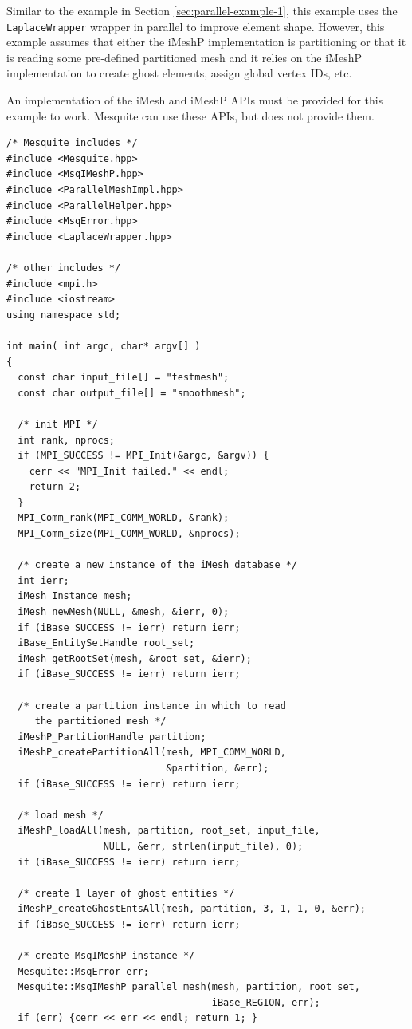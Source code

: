 Similar to the example in Section \ref{sec:parallel-example-1}, this example uses the \texttt{LaplaceWrapper} wrapper in parallel to improve element shape.  However, this example assumes that either the iMeshP implementation is partitioning or that it is reading some pre-defined partitioned mesh and it relies on the iMeshP implementation to create ghost elements, assign global vertex IDs, etc.  

An implementation of the iMesh and iMeshP APIs must be provided for this example to work.  Mesquite can use these APIs, but does not provide them.

\begin{verbatim}
/* Mesquite includes */
#include <Mesquite.hpp>
#include <MsqIMeshP.hpp>
#include <ParallelMeshImpl.hpp>
#include <ParallelHelper.hpp>
#include <MsqError.hpp>
#include <LaplaceWrapper.hpp>

/* other includes */
#include <mpi.h>
#include <iostream>
using namespace std;
  
int main( int argc, char* argv[] )
{
  const char input_file[] = "testmesh";
  const char output_file[] = "smoothmesh";

  /* init MPI */
  int rank, nprocs;
  if (MPI_SUCCESS != MPI_Init(&argc, &argv)) {
    cerr << "MPI_Init failed." << endl;
    return 2;
  }
  MPI_Comm_rank(MPI_COMM_WORLD, &rank);
  MPI_Comm_size(MPI_COMM_WORLD, &nprocs);

  /* create a new instance of the iMesh database */
  int ierr;
  iMesh_Instance mesh;
  iMesh_newMesh(NULL, &mesh, &ierr, 0); 
  if (iBase_SUCCESS != ierr) return ierr;
  iBase_EntitySetHandle root_set;
  iMesh_getRootSet(mesh, &root_set, &ierr);
  if (iBase_SUCCESS != ierr) return ierr;

  /* create a partition instance in which to read 
     the partitioned mesh */
  iMeshP_PartitionHandle partition;
  iMeshP_createPartitionAll(mesh, MPI_COMM_WORLD, 
                            &partition, &err);
  if (iBase_SUCCESS != ierr) return ierr;

  /* load mesh */
  iMeshP_loadAll(mesh, partition, root_set, input_file, 
                 NULL, &err, strlen(input_file), 0); 
  if (iBase_SUCCESS != ierr) return ierr;

  /* create 1 layer of ghost entities */
  iMeshP_createGhostEntsAll(mesh, partition, 3, 1, 1, 0, &err); 
  if (iBase_SUCCESS != ierr) return ierr;

  /* create MsqIMeshP instance */
  Mesquite::MsqError err;
  Mesquite::MsqIMeshP parallel_mesh(mesh, partition, root_set, 
                                    iBase_REGION, err);
  if (err) {cerr << err << endl; return 1; }


\end{verbatim}
